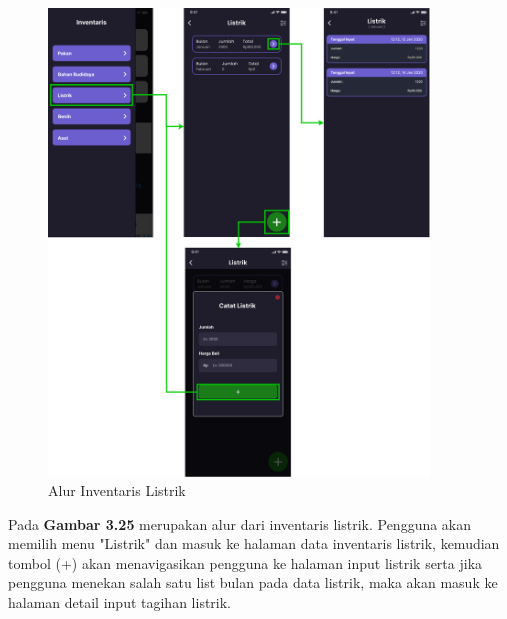 \begin{enumerate}
\begin{enumerate}
		\begin{figure}[H]
			\centering
			\includegraphics[width=0.9\textwidth]{gambar/sprint2/flow_electric.png}
			\caption{Alur Inventaris Listrik}
		\end{figure}

		Pada \textbf{Gambar 3.25} merupakan alur dari inventaris listrik. Pengguna akan memilih menu "Listrik" dan masuk ke halaman data inventaris listrik, kemudian tombol (+) akan menavigasikan pengguna ke halaman input listrik serta jika pengguna menekan salah satu list bulan pada data listrik, maka akan masuk ke halaman detail input tagihan listrik.


\end{enumerate}
\end{enumerate}

